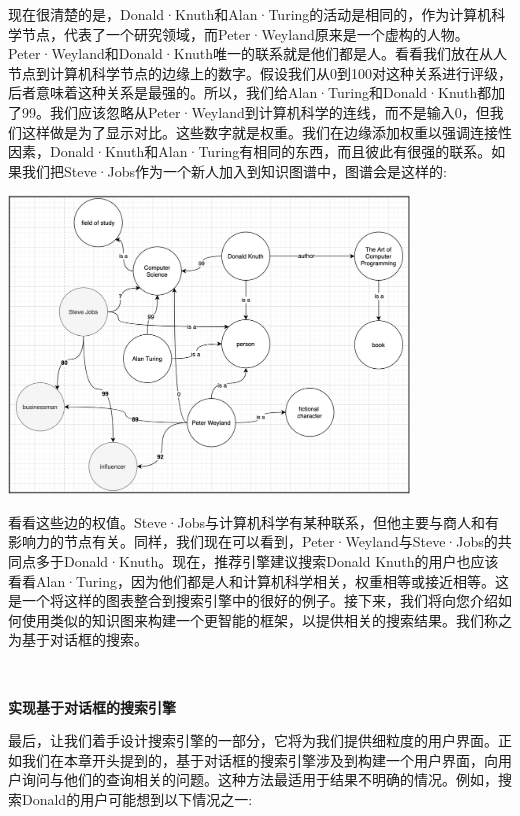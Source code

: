 现在很清楚的是，Donald·Knuth和Alan·Turing的活动是相同的，作为计算机科学节点，代表了一个研究领域，而Peter·Weyland原来是一个虚构的人物。Peter·Weyland和Donald·Knuth唯一的联系就是他们都是人。看看我们放在从人节点到计算机科学节点的边缘上的数字。假设我们从0到100对这种关系进行评级，后者意味着这种关系是最强的。所以，我们给Alan·Turing和Donald·Knuth都加了99。我们应该忽略从Peter·Weyland到计算机科学的连线，而不是输入0，但我们这样做是为了显示对比。这些数字就是权重。我们在边缘添加权重以强调连接性因素，Donald·Knuth和Alan·Turing有相同的东西，而且彼此有很强的联系。如果我们把Steve·Jobs作为一个新人加入到知识图谱中，图谱会是这样的: \par

\begin{center}
	\includegraphics[width=0.8\textwidth]{content/Section-3/Chapter-16/16}
\end{center}

看看这些边的权值。Steve·Jobs与计算机科学有某种联系，但他主要与商人和有影响力的节点有关。同样，我们现在可以看到，Peter·Weyland与Steve·Jobs的共同点多于Donald·Knuth。现在，推荐引擎建议搜索Donald Knuth的用户也应该看看Alan·Turing，因为他们都是人和计算机科学相关，权重相等或接近相等。这是一个将这样的图表整合到搜索引擎中的很好的例子。接下来，我们将向您介绍如何使用类似的知识图来构建一个更智能的框架，以提供相关的搜索结果。我们称之为基于对话框的搜索。 \par

\noindent\textbf{}\ \par
\textbf{实现基于对话框的搜索引擎} \ \par
最后，让我们着手设计搜索引擎的一部分，它将为我们提供细粒度的用户界面。正如我们在本章开头提到的，基于对话框的搜索引擎涉及到构建一个用户界面，向用户询问与他们的查询相关的问题。这种方法最适用于结果不明确的情况。例如，搜索Donald的用户可能想到以下情况之一: \par

